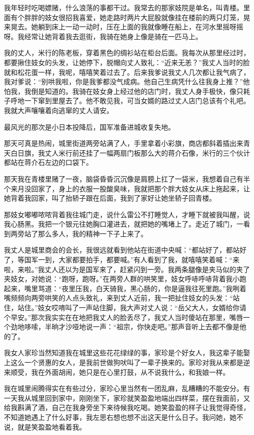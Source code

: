\documentclass[12pt,UTF8]{ctexbook}
\begin{document}
我年轻时吃喝嫖赌，什么浪荡的事都干过。我常去的那家妓院是单名，叫青楼。里面有个胖胖的妓女很招我喜爱，她走路时两片大屁股就像挂在楼前的两只灯笼，晃来晃去。她躺到床上一动一动时，压在上面的我就像睡在船上，在河水里摇呀摇呀。我经常让她背着我去逛街，我骑在她身上像是骑在一匹马上。

我的丈人，米行的陈老板，穿着黑色的绸衫站在柜台后面。我每次从那里经过时，都要揪住妓女的头发，让她停下，脱帽向丈人致礼：“近来无恙？”我丈人当时的脸就和松花蛋一样，我呢，嘻嘻笑着过去了。后来我爹说我丈人几次都让我气病了，我对爹说：“别哄我啦，你是我爹都没气成病。他自己生病凭什么往我身上推？”他怕我，我倒是知道的。我骑在妓女身上经过他的店门时，我丈人身手极快，像只耗子呼地一下窜到里屋去了。他不敢见我，可当女婿的路过丈人店门总该有个礼吧。我就大声嚷嚷着向逃窜的丈人请安。

最风光的那次是小日本投降后，国军准备进城收复失地。

那天可真是热闹，城里街道两旁站满了人，手里拿着小彩旗，商店都斜着插出来青天白日旗，我丈人米行前还挂了一幅两扇门板那么大的蒋介石像，米行的三个伙计都站在蒋介石左边的口袋下。

那天我在青楼里赌了一夜，脑袋昏昏沉沉像是肩膀上扛了一袋米，我想着自己有半个来月没回家了，身上的衣服一股酸臭味，我就把那个胖大妓女从床上拖起来，让她背着我回家，叫了抬轿子跟在后面，我到了家好让她坐轿子回青楼。

那妓女嘟嘟哝哝背着我往城门走，说什么雷公不打睡觉人，才睡下就被我叫醒，说我心肠黑。我把一个银元往她胸口灌进去，就把她的嘴堵上了。走近了城门，一看到两旁站了那么多人，我的精神一下子上来了。

我丈人是城里商会的会长，我很远就看到他站在街道中央喊：“都站好了，都站好了，等国军一到，大家都要拍手，都要喊。”有人看到了我，就嘻嘻笑着喊：“来啦，来啦。”我丈人还以为是国军来了，赶紧闪到一旁。我两条腿像是夹马似的夹了夹妓女，对她说：“跑呀，跑呀。”在两旁人群的哄笑里，妓女呼哧呼哧背着我小跑起来，嘴里骂道：“夜里压我，白天骑我，黑心肠的，你是逼我往死里跑。”我咧着嘴频频向两旁哄笑的人点头致礼，来到丈人近前，我一把扯住妓女的头发：“站住，站住。”妓女哎唷叫了一声站住脚，我大声对丈人说：“岳父大人，女婿给你请个早安。”那次我实实在在地把我丈人的脸丢尽了，我丈人当时傻站在那里，嘴唇一个劲地哆嗦，半晌才沙哑地说一声：“祖宗，你快走吧。”那声音听上去都不像是他的了。

我女人家珍当然知道我在城里这些花花绿绿的事，家珍是个好女人，我这辈子能娶上这么一个贤惠的女人，是我前世做狗吠叫了一辈子换来的。家珍对我从来都是逆来顺受，我在外面胡闹，她只是在心里打鼓，从不说我什么，和我娘一样。

我在城里闹腾得实在有些过分，家珍心里当然有一团乱麻，乱糟糟的不能安分。有一天我从城里回到家中，刚刚坐下，家珍就笑盈盈地端出四样菜，摆在我面前，又给我斟满了酒，自己在我身旁坐下来待候我吃喝。她笑盈盈的样子让我觉得奇怪，不知道她遇上了什么好事，我左思右想也想不出这天是什么日子。我问她，她不说，就是笑盈盈地看着我。
\end{document}
